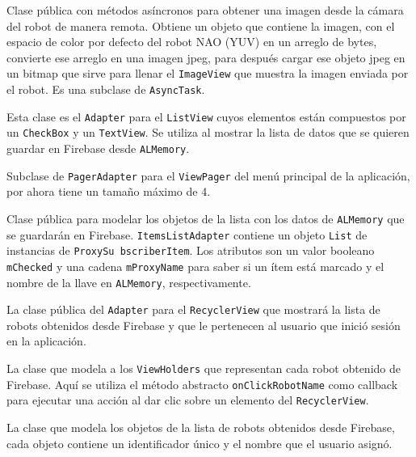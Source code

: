 Clase pública con métodos asíncronos para obtener una imagen desde la cámara del robot de manera remota.  Obtiene un objeto que contiene la imagen, con el espacio de color por defecto del robot NAO (YUV) en un arreglo de bytes, convierte ese arreglo en una imagen jpeg, para después cargar ese objeto jpeg en un bitmap que sirve para llenar el \texttt{ImageView} que muestra la imagen enviada por el robot. Es una subclase
de \texttt{AsyncTask}.


Esta clase es el \texttt{Adapter} para el \texttt{ListView} cuyos elementos 
están compuestos por un \texttt{CheckBox} y un \texttt{TextView}. Se 
utiliza al mostrar la lista de datos que se quieren guardar en 
Firebase desde \texttt{ALMemory}.


Subclase de \texttt{PagerAdapter} para el \texttt{ViewPager} del menú
principal de la aplicación, por ahora tiene un tamaño máximo de 4. 


Clase pública para modelar los objetos de la lista con los datos de \texttt{ALMemory} que se guardarán en Firebase. \texttt{ItemsListAdapter} contiene un objeto \texttt{List} de
instancias de \texttt{ProxySu	bscriberItem}. Los
atributos son un  valor booleano \texttt{mChecked} y una cadena \texttt{mProxyName} para saber si un ítem está marcado y el nombre
de la llave en \texttt{ALMemory}, respectivamente.


La clase pública del \texttt{Adapter} para el \texttt{RecyclerView} que mostrará la lista de robots obtenidos desde Firebase y que le pertenecen al
usuario que inició sesión en la aplicación.


La clase que modela a los \texttt{ViewHolders} que representan cada robot obtenido de Firebase.
Aquí se utiliza el método abstracto \texttt{onClickRobotName} como callback para ejecutar una acción al dar clic sobre un elemento del \texttt{RecyclerView}.


La clase que modela los objetos de la lista de robots obtenidos desde Firebase, cada objeto contiene un identificador único y el nombre que el usuario asignó.

